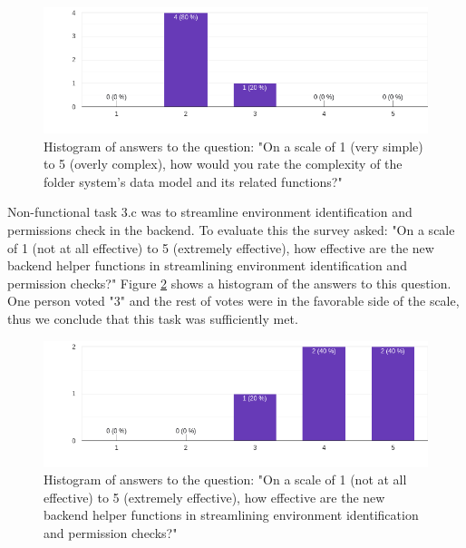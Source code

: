 \begin{figure}[h]
	\centering
  \includegraphics[scale=0.55]{../../figures/survey/3.2-folder-structures.png}
	\caption{Histogram of answers to the question: "On a scale of 1 (very simple) to 5 (overly complex), how would you rate the
complexity of the folder system’s data model and its related functions?"}
	\label{fig:evaluation:non-functional:3.2}
\end{figure}


Non-functional task 3.c was to streamline environment identification and permissions check in the backend.
To evaluate this the survey asked: 
"On a scale of 1 (not at all effective) to 5 (extremely effective), how effective are the
new backend helper functions in streamlining environment identification and permission
checks?"
Figure \ref{fig:evaluation:non-functional:3.3} shows a histogram of the answers to this question.
One person voted "3" and the rest of votes were in the favorable side of the scale,
thus we conclude that this task was sufficiently met.

\begin{figure}[h]
	\centering
  \includegraphics[scale=0.55]{../../figures/survey/3.3-backend-permissions.png}
	\caption{Histogram of answers to the question: "On a scale of 1 (not at all effective) to 5 (extremely effective), how effective are the
new backend helper functions in streamlining environment identification and permission checks?"}
	\label{fig:evaluation:non-functional:3.3}
\end{figure}

